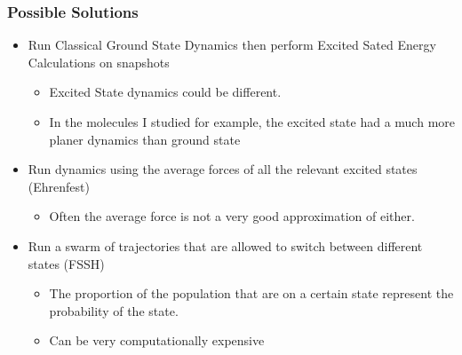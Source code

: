 \documentclass{beamer}
\begin{document}
\begin{frame}
  \frametitle{Possible Solutions}
\begin{itemize}
  \item Run Classical Ground State Dynamics then perform Excited Sated Energy Calculations on snapshots
  \begin{itemize}
    \item Excited State dynamics could be different.
    \item In the molecules I studied for example, the excited state had a
      much more planer dynamics than ground state
  \end{itemize}
  \item Run dynamics using the average forces of all the relevant excited states (Ehrenfest)
  \begin{itemize}
    \item Often the average force is not a very good approximation of either. 
  \end{itemize}
  \item Run a swarm of trajectories that are allowed to switch between different
    states (FSSH)
  \begin{itemize}
    \item The proportion of the population that are on a certain state represent the probability of the state.
    \item Can be very computationally expensive
  \end{itemize}
\end{itemize}
\end{frame}
\end{document}
